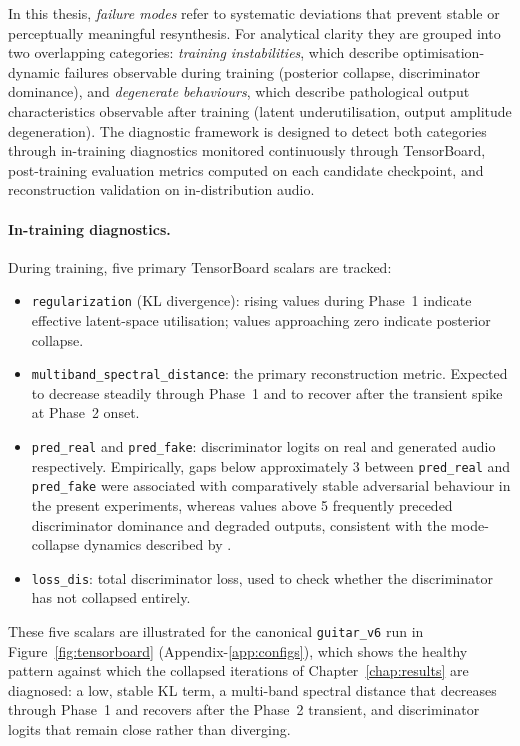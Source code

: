 \documentclass[a4paper,11pt,oneside,openany]{book}
\begin{document}
\medskip

In this thesis, \textit{failure modes} refer to systematic deviations that prevent stable or perceptually meaningful resynthesis. For analytical clarity they are grouped into two overlapping categories: \textit{training instabilities}, which describe optimisation-dynamic failures observable during training (posterior collapse, discriminator dominance), and \textit{degenerate behaviours}, which describe pathological output characteristics observable after training (latent underutilisation, output amplitude degeneration). The diagnostic framework is designed to detect both categories through in-training diagnostics monitored continuously through TensorBoard, post-training evaluation metrics computed on each candidate checkpoint, and reconstruction validation on in-distribution audio.

\paragraph{In-training diagnostics.} During training, five primary TensorBoard scalars are tracked:
\begin{itemize}
\item \texttt{regularization} (KL divergence): rising values during Phase~1 indicate effective latent-space utilisation; values approaching zero indicate posterior collapse.
\item \texttt{multiband\_spectral\_distance}: the primary reconstruction metric. Expected to decrease steadily through Phase~1 and to recover after the transient spike at Phase~2 onset.
\item \texttt{pred\_real} and \texttt{pred\_fake}: discriminator logits on real and generated audio respectively. Empirically, gaps below approximately 3 between \texttt{pred\_real} and \texttt{pred\_fake} were associated with comparatively stable adversarial behaviour in the present experiments, whereas values above 5 frequently preceded discriminator dominance and degraded outputs, consistent with the mode-collapse dynamics described by \textcite{goodfellow2014gan}.
\item \texttt{loss\_dis}: total discriminator loss, used to check whether the discriminator has not collapsed entirely.
\end{itemize}

These five scalars are illustrated for the canonical \texttt{guitar\_v6} run in Figure~\ref{fig:tensorboard} (Appendix-\ref{app:configs}), which shows the healthy pattern against which the collapsed iterations of Chapter~\ref{chap:results} are diagnosed: a low, stable KL term, a multi-band spectral distance that decreases through Phase~1 and recovers after the Phase~2 transient, and discriminator logits that remain close rather than diverging.
\end{document}
